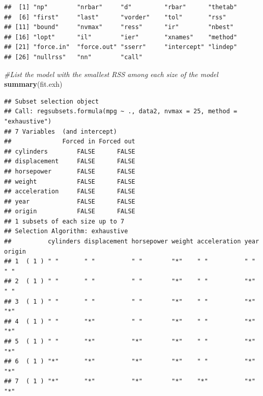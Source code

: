 \documentclass[]{article}
\newenvironment{Shaded}{\begin{snugshade}}{\end{snugshade}}
\newcommand{\KeywordTok}[1]{\textcolor[rgb]{0.13,0.29,0.53}{\textbf{#1}}}
\newcommand{\CommentTok}[1]{\textcolor[rgb]{0.56,0.35,0.01}{\textit{#1}}}
\newcommand{\OperatorTok}[1]{\textcolor[rgb]{0.81,0.36,0.00}{\textbf{#1}}}
\newcommand{\NormalTok}[1]{#1}
\begin{document}
\begin{verbatim}
##  [1] "np"        "nrbar"     "d"         "rbar"      "thetab"   
##  [6] "first"     "last"      "vorder"    "tol"       "rss"      
## [11] "bound"     "nvmax"     "ress"      "ir"        "nbest"    
## [16] "lopt"      "il"        "ier"       "xnames"    "method"   
## [21] "force.in"  "force.out" "sserr"     "intercept" "lindep"   
## [26] "nullrss"   "nn"        "call"
\end{verbatim}

\begin{Shaded}
\begin{Highlighting}[]
\CommentTok{#List the model with the smallest RSS among each size of the model}
\KeywordTok{summary}\NormalTok{(fit.exh)}
\end{Highlighting}
\end{Shaded}

\begin{verbatim}
## Subset selection object
## Call: regsubsets.formula(mpg ~ ., data2, nvmax = 25, method = "exhaustive")
## 7 Variables  (and intercept)
##              Forced in Forced out
## cylinders        FALSE      FALSE
## displacement     FALSE      FALSE
## horsepower       FALSE      FALSE
## weight           FALSE      FALSE
## acceleration     FALSE      FALSE
## year             FALSE      FALSE
## origin           FALSE      FALSE
## 1 subsets of each size up to 7
## Selection Algorithm: exhaustive
##          cylinders displacement horsepower weight acceleration year origin
## 1  ( 1 ) " "       " "          " "        "*"    " "          " "  " "   
## 2  ( 1 ) " "       " "          " "        "*"    " "          "*"  " "   
## 3  ( 1 ) " "       " "          " "        "*"    " "          "*"  "*"   
## 4  ( 1 ) " "       "*"          " "        "*"    " "          "*"  "*"   
## 5  ( 1 ) " "       "*"          "*"        "*"    " "          "*"  "*"   
## 6  ( 1 ) "*"       "*"          "*"        "*"    " "          "*"  "*"   
## 7  ( 1 ) "*"       "*"          "*"        "*"    "*"          "*"  "*"
\end{verbatim}

\begin{Shaded}
\end{Shaded}
\end{document}
